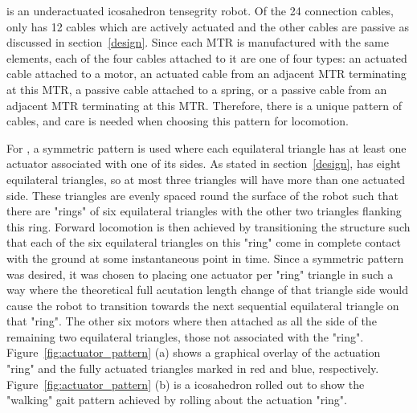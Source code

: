 \SB{} is an underactuated icosahedron tensegrity robot.
Of the 24 connection cables, \SB{} only has 12 cables which are actively actuated and the other cables are passive as discussed in section~\ref{design}.
Since each MTR is manufactured with the same elements, each of the four cables attached to it are one of four types: an actuated cable attached to a motor, an actuated cable from an adjacent MTR terminating at this MTR, a passive cable attached to a spring, or a passive cable from an adjacent MTR terminating at this MTR.
Therefore, there is a unique pattern of cables, and care is needed when choosing this pattern for locomotion. 

For \SB{}, a symmetric pattern is used where each equilateral triangle has at least one actuator associated with one of its sides.
As stated in section~\ref{design}, \SB{} has eight equilateral triangles, so at most three triangles will have more than one actuated side.
These triangles are evenly spaced round the surface of the robot such that there are "rings" of six equilateral triangles with the other two triangles flanking this ring.
Forward locomotion is then achieved by transitioning the structure such that each of the six equilateral triangles on this "ring" come in complete contact with the ground at some instantaneous point in time.
Since a symmetric pattern was desired, it was chosen to placing one actuator per "ring" triangle in such a way where the theoretical full acutation length change of that triangle side would cause the robot to transition towards the next sequential equilateral triangle on that "ring".
The other six motors where then attached as all the side of the remaining two equilateral triangles, those not associated with the "ring".
Figure~\ref{fig:actuator_pattern} (a) shows a graphical overlay of the actuation "ring" and the fully actuated triangles marked in red and blue, respectively.
Figure~\ref{fig:actuator_pattern} (b) is a icosahedron rolled out to show the "walking" gait pattern achieved by rolling about the actuation "ring".


